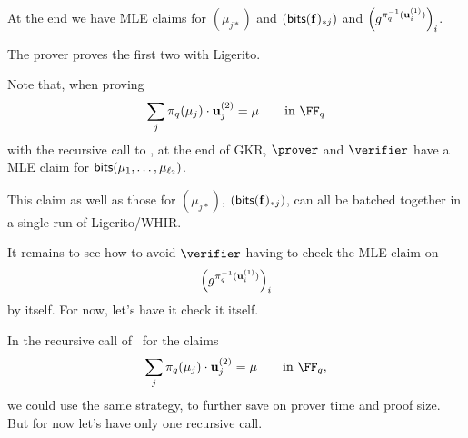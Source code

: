 \documentclass[11pt,letterpaper,usenames,dvipsnames]{article}
\begin{document}
At the end we have MLE claims for $(\mu_{j*})$ and $(\mathsf{bits}(\mathbf{f})_{*j})$ and $\left(g^{\pi_q^{-1}(\mathbf{u}_i^{(1)})}\right)_i$.

The prover proves the first two with Ligerito.

Note that, when proving
%
\[
\sum_{j} \pi_q(\mu_j)\cdot \uu_j^{(2)} = \mu \qquad \text{in } \FF_q
\]
%
with the recursive call to \ftwoz, at the end of GKR, $\prover$ and $\verifier$ have a MLE claim for $\mathsf{bits}(\mu_1, \ldots, \mu_{\ell_2})$.

This claim as well as those for $(\mu_{j*})$, $(\mathsf{bits}(\mathbf{f})_{*j})$, can all be batched together in a single run of Ligerito/WHIR.

It remains to see how to avoid $\verifier$ having to check the MLE claim on
%
\[
\left(g^{\pi_q^{-1}(\mathbf{u}_i^{(1)})}\right)_i
\]
%
by itself. For now, let's have it check it itself.

In the recursive call of \ftwoz\ for the claims
%
\[
\sum_{j} \pi_q(\mu_j)\cdot \uu_j^{(2)} = \mu \qquad \text{in } \FF_q,
\]
%
we could use the same strategy, to further save on prover time and proof size. But for now let's have only one recursive call.
\end{document}
